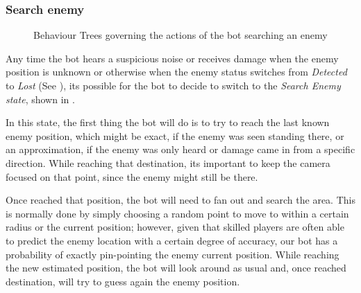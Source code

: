 \subsubsection{Search enemy}
\begin{figure}
\centering
\captionsetup[subfigure]{}

\caption{Behaviour Trees governing the actions of the bot searching an enemy}
\label{fig:search_bt}
\end{figure}

Any time the bot hears a suspicious noise or receives damage when the enemy position is unknown or otherwise when the enemy status switches from \textit{Detected} to \textit{Lost} (See ), its possible for the bot to decide to switch to the \textit{Search Enemy state}, shown in .

In this state, the first thing the bot will do is to try to reach the last known enemy position, which might be exact, if the enemy was seen standing there, or an approximation, if the enemy was only heard or damage came in from a specific direction. While reaching that destination, its important to keep the camera focused on that point, since the enemy might still be there. 

Once reached that position, the bot will need to fan out and search the area. This is normally done by simply choosing a random point to move to within a certain radius or the current position; however, given that skilled players are often able to predict the enemy location with a certain degree of accuracy, our bot has a probability of exactly pin-pointing the enemy current position. While reaching the new estimated position, the bot will look around as usual and, once reached destination, will try to guess again the enemy position.

